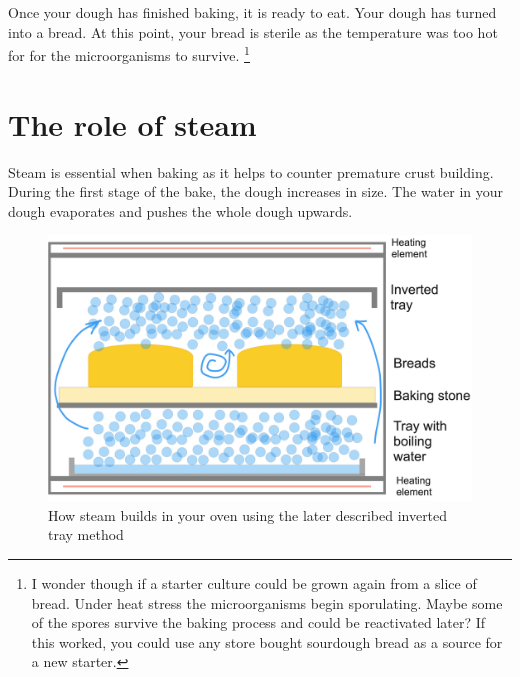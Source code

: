 Once your dough has finished baking, it is ready to eat. Your
dough has turned into a bread. At this
point, your bread is sterile as the temperature was too hot for
for the microorganisms to survive. \footnote{I wonder though
if a starter culture could be grown again from a slice of bread.
Under heat stress the microorganisms begin sporulating. Maybe
some of the spores survive the baking process and could be reactivated
later? If this worked, you could use any store bought sourdough
bread as a source for a new starter.}

\section{The role of steam}

Steam is essential when baking as it helps to counter premature
crust building. During the first stage of the bake, the dough
increases in size. The water in your dough evaporates and pushes
the whole dough upwards. 

\begin{figure}[!htb]
  \includegraphics[width=\textwidth]{baking-process-steam.jpg}
  \caption{How steam builds in your oven using the later described
  inverted tray method}
\end{figure}

